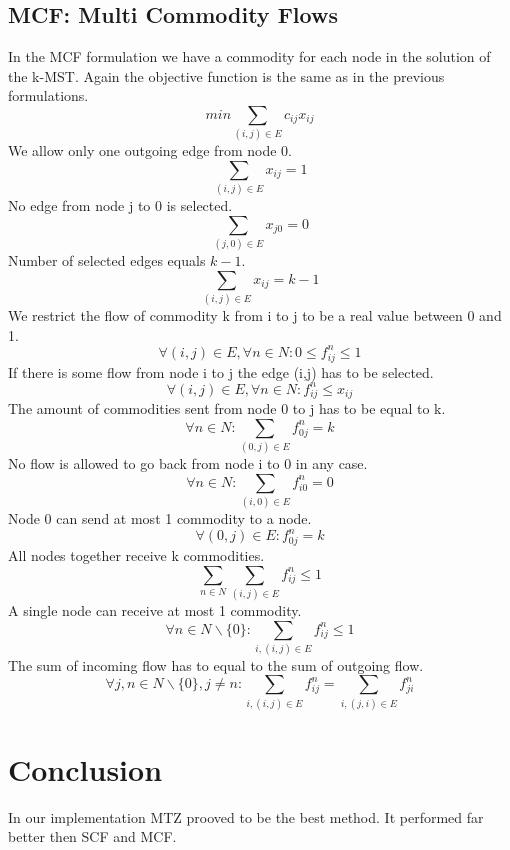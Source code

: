 \documentclass{article}
\begin{document}
\subsection{MCF: Multi Commodity Flows \label{mcf}}
In the MCF formulation we have a commodity for each node in the solution of the k-MST. Again the objective function is the same as in the previous formulations.
\setcounter{equation}{0}
\begin{equation}
min \sum_{(i,j) \in E} c_{ij} x_{ij}
\end{equation}
We allow only one outgoing edge from node 0.
\begin{equation}
\sum_{(i,j) \in E} x_{ij} = 1
\end{equation}
No edge from node j to 0 is selected.
\begin{equation}
\sum_{(j,0) \in E} x_{j0} = 0
\end{equation}
Number of selected edges equals $k-1$.
\begin{equation}
\sum_{(i,j) \in E} x_{ij} = k - 1
\end{equation}
We restrict the flow of commodity k from i to j to be a real value between 0 and 1.
\begin{equation}
\forall (i,j) \in E, \forall n \in N : 0 \le f_{ij}^{n} \le 1
\end{equation}
If there is some flow from node i to j the edge (i,j) has to be selected.
\begin{equation}
\forall (i,j) \in E, \forall n \in N : f_{ij}^{n} \le x_{ij} 
\end{equation}
The amount of commodities sent from node 0 to j has to be equal to k.
\begin{equation}
\forall n \in N: \sum_{(0,j) \in E} f_{0j}^{n} = k
\end{equation}
No flow is allowed to go back from node i to 0 in any case.
\begin{equation}
\forall n \in N: \sum_{(i,0) \in E} f_{i0}^{n} = 0
\end{equation}
Node 0 can send at most 1 commodity to a node.
\begin{equation}
\forall (0,j) \in E : f_{0j}^{n} = k
\end{equation}
All nodes together receive k commodities.
\begin{equation}
\sum_{n \in N} \sum_{(i,j) \in E} f_{ij}^{n} \le 1
\end{equation}
A single node can receive at most 1 commodity.
\begin{equation}
\forall n \in N \backslash \{0\} : \sum_{i,(i,j) \in E} f_{ij}^{n} \le 1
\end{equation}
The sum of incoming flow has to equal to the sum of outgoing flow.
\begin{equation}
\forall j,n \in N \backslash \{0\}, j \not= n : \sum_{i,(i,j) \in E} f_{ij}^{n} = \sum_{i,(j,i) \in E} f_{ji}^{n}
\end{equation}



\section{Conclusion}
In our implementation MTZ prooved to be the best method. It performed far better then SCF and MCF.
\end{document}
